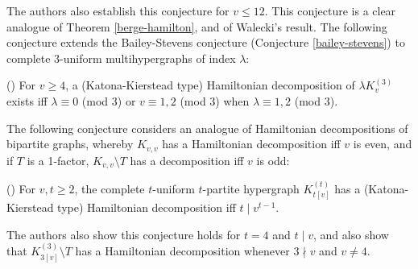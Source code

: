 The authors also establish this conjecture for $v \leq 12$. This conjecture is a
clear analogue of Theorem \ref{berge-hamilton}, and of Walecki's result. The
following conjecture extends the Bailey-Stevens conjecture (Conjecture
\ref{bailey-stevens}) to complete $3$-uniform multihypergraphs of index $\lambda$:

\begin{conjecture} (\cite{mesz-rosa})
For $v \geq 4$, a (Katona-Kierstead type) Hamiltonian decomposition of
$\lambda K_v^{(3)}$ exists iff $\lambda \equiv 0$ (mod $3$) or $v \equiv 1, 2$
(mod $3$) when $\lambda \equiv 1,2$ (mod $3$).
\end{conjecture}

The following conjecture considers an analogue of
Hamiltonian decompositions of bipartite graphs, whereby $K_{v,v}$ has a
Hamiltonian decomposition iff $v$ is even, and if $T$ is a 1-factor,
$K_{v,v} \setminus T$ has a decomposition iff $v$ is odd:

\begin{conjecture} (\cite{kuhl-schr})
For $v, t \geq 2$, the complete $t$-uniform $t$-partite hypergraph
$K_{t[v]}^{(t)}$ has a (Katona-Kierstead type) Hamiltonian decomposition iff
$t \mid v^{t-1}$.
\end{conjecture}

The authors also show this conjecture holds for $t = 4$ and $t \mid v$, and
also show that $K_{3[v]}^{(3)} \setminus T$ has a Hamiltonian decomposition
whenever $3 \nmid v$ and $v \neq 4$.
